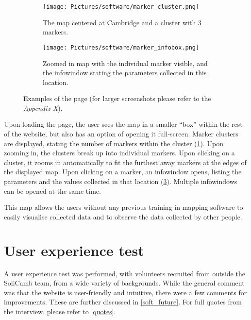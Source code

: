     \begin{figure}[H]
    \begin{subfigure}[t]{.48\textwidth}
        \centering
        \texttt{[image: Pictures/software/marker\_cluster.png]}
        \captionsetup{justification=centering}
        \caption{The map centered at Cambridge and a cluster with 3 markers.}
        \label{fig:marker_cluster}
    \end{subfigure}
    \begin{subfigure}[t]{.48\textwidth}
        \centering
        \texttt{[image: Pictures/software/marker\_infobox.png]}
        \captionsetup{justification=centering}
        \caption{Zoomed in map with the individual marker visible, and the infowindow stating the parameters collected in this location.}
        \label{fig:infowindow}
    \end{subfigure}
    \captionsetup{justification=centering}
    \caption{Examples of the  page (for larger screenshots please refer to the \textit{Appendix X}).}
\end{figure}

Upon loading the page, the user sees the map in a smaller ``box'' within the rest of the website, but also has an option of opening it full-screen. Marker clusters are displayed, stating the number of markers within the cluster (\cref{fig:marker_cluster}). Upon zooming in, the clusters break up into individual markers. Upon clicking on a cluster, it zooms in automatically to fit the furthest away markers at the edges of the displayed map. Upon clicking on a marker, an infowindow opens, listing the parameters and the values collected in that location (\cref{fig:infowindow}). Multiple infowindows can be opened at the same time.

This map allows the users without any previous training in mapping software to easily visualise collected data and to observe the data collected by other people.

\section{User experience test}
A user experience test was performed, with volunteers recruited from outside the SoliCamb team, from a wide variety of backgrounds. While the general comment was that the website is user-friendly and intuitive, there were a few comments for improvements. These are further discussed in \cref{soft_future}. For full quotes from the interview, please refer to \cref{quotes}.